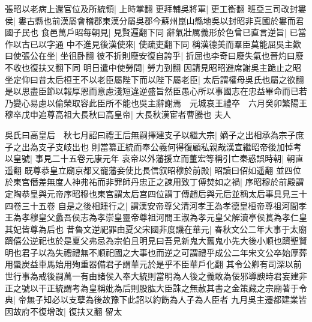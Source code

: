 張昭以老病上還官位及所統領|{
	上時掌翻}
更拜輔吳將軍|{
	更工衡翻}
班亞三司改封婁侯|{
	婁古縣也前漢屬會稽郡東漢分屬吳郡今蘇州崑山縣地吳以封昭非真國於婁而君國子民也}
食邑萬戶昭每朝見|{
	見賢遍翻下同}
辭氣壯厲義形於色曾已直言逆旨|{
	已當作以古已以字通}
中不進見後漢使來|{
	使疏吏翻下同}
稱漢德美而羣臣莫能屈吳主歎曰使張公在坐|{
	坐徂卧翻}
彼不折則廢安復自誇乎|{
	折屈也李奇曰廢失氣也晉灼曰廢不收也復扶又翻下同}
明日遣中使勞問|{
	勞力到翻}
因請見昭昭避席謝吳主跪止之昭坐定仰曰昔太后桓王不以老臣屬陛下而以陛下屬老臣|{
	太后謂權母吳氏也屬之欲翻}
是以思盡臣節以報厚恩而意慮淺短違逆盛旨然臣愚心所以事國志在忠益畢命而已若乃變心易慮以偷榮取容此臣所不能也吳主辭謝焉　元城哀王禮卒　六月癸卯繁陽王穆卒戊申追尊高祖大長秋曰高皇帝|{
	大長秋漢宦者曹騰也}
夫人

吳氏曰高皇后　秋七月詔曰禮王后無嗣擇建支子以繼大宗|{
	嫡子之出相承為宗子庶子之出為支子支岐出也}
則當纂正統而奉公義何得復顧私親哉漢宣繼昭帝後加悼考以皇號|{
	事見二十五卷元康元年}
哀帝以外藩援立而董宏等稱引亡秦惑誤時朝|{
	朝直遥翻}
既尊恭皇立廟京都又寵藩妾使比長信叙昭穆於前殿|{
	昭讀曰佋如遥翻}
並四位於東宫僭差無度人神弗祐而非罪師丹忠正之諫用致丁傅焚如之禍|{
	序昭穆於前殿謂定陶恭皇與元帝序昭穆也東宫謂太后宫四位謂丁傳趙后與元后並稱太后事具見三十四卷三十五卷}
自是之後相踵行之|{
	謂漢安帝尊父清河孝王為孝德皇桓帝尊祖河間孝王為孝穆皇父蠡吾侯志為孝崇皇靈帝尊祖河間王淑為孝元皇父解瀆亭侯萇為孝仁皇其妃皆尊為后也}
昔魯文逆祀罪由夏父宋國非度譏在華元|{
	春秋文公二年大事于太廟躋僖公逆祀也於是夏父弗忌為宗伯且明見曰吾見新鬼大舊鬼小先大後小順也躋聖賢明也君子以為失禮禮無不順祀國之大事也而逆之可謂禮乎成公二年宋文公卒始厚葬用蜃炭益車馬始用殉重器備君子謂華元於是乎不臣華戶化翻}
其令公卿有司深以前世行事為戒後嗣萬一有由諸侯入奉大統則當明為人後之義敢為佞邪導諛時君妄建非正之號以干正統謂考為皇稱妣為后則股肱大臣誅之無赦其書之金策藏之宗廟著于令典|{
	帝無子知必以支孽為後故豫下此詔以約飭為人子為人臣者}
九月吳主遷都建業皆因故府不復增改|{
	復扶又翻}
留太


